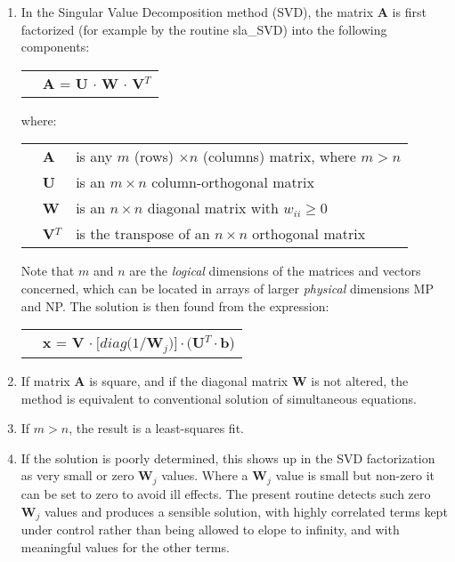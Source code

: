 \documentclass[11pt,twoside,nolof]{starlink}
\begin{document}
{
 \begin{enumerate}
  \item In the Singular Value Decomposition method (SVD),
        the matrix \textbf{A} is first factorized (for example by
        the routine sla\_SVD) into the following components:

        \begin{tabular}{ll}
        & \textbf{A} = \textbf{U} $\cdot$ \textbf{W} $\cdot$ \textbf{V}$^{T}$
        \end{tabular}

        where:

        \begin{tabular}{lll}
        & \textbf{A} & is any $m$ (rows) $\times n$ (columns) matrix,
                      where $m > n$ \\
        & \textbf{U} & is an $m \times n$ column-orthogonal matrix \\
        & \textbf{W} & is an $n \times n$ diagonal matrix with
                      $w_{ii} \geq 0$ \\
        & \textbf{V}$^{T}$ & is the transpose of an $n \times n$
                            orthogonal matrix
        \end{tabular}

        Note that $m$ and $n$ are the \textit{logical}\/ dimensions of the
        matrices and vectors concerned, which can be located in
        arrays of larger \textit{physical}\/ dimensions MP and NP.
        The solution is then found from the expression:

        \begin{tabular}{ll}
        & \textbf{x} = \textbf{V} $\cdot~[diag(1/$\textbf{W}$_{j})]
           \cdot ($\textbf{U}$^{T} \cdot$\textbf{b})
        \end{tabular}

  \item If matrix \textbf{A} is square, and if the diagonal matrix \textbf{W} is not
        altered, the method is equivalent to conventional solution
        of simultaneous equations.
  \item If $m > n$, the result is a least-squares fit.
  \item If the solution is poorly determined, this shows up in the
        SVD factorization as very small or zero \textbf{W}$_{j}$ values.  Where
        a \textbf{W}$_{j}$ value is small but non-zero it can be set to zero to
        avoid ill effects.  The present routine detects such zero
        \textbf{W}$_{j}$ values and produces a sensible solution, with highly
        correlated terms kept under control rather than being allowed
        to elope to infinity, and with meaningful values for the
       other terms.
 \end{enumerate}
}
\end{document}
